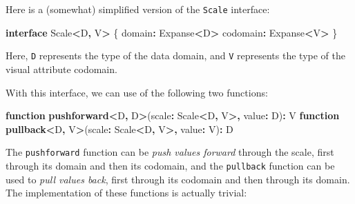\documentclass[
]{book}
\newenvironment{Shaded}{\begin{snugshade}}{\end{snugshade}}
\newcommand{\FunctionTok}[1]{\textcolor[rgb]{0.13,0.29,0.53}{\textbf{#1}}}
\newcommand{\KeywordTok}[1]{\textcolor[rgb]{0.13,0.29,0.53}{\textbf{#1}}}
\newcommand{\NormalTok}[1]{#1}
\newcommand{\OperatorTok}[1]{\textcolor[rgb]{0.81,0.36,0.00}{\textbf{#1}}}
\theoremstyle{definition}
\theoremstyle{definition}
\theoremstyle{definition}
\theoremstyle{definition}
\theoremstyle{remark}
\begin{document}
Here is a (somewhat) simplified version of the \texttt{Scale} interface:

\begin{Shaded}
\begin{Highlighting}[]
\KeywordTok{interface}\NormalTok{ Scale}\OperatorTok{\textless{}}\NormalTok{D}\OperatorTok{,}\NormalTok{ V}\OperatorTok{\textgreater{}}\NormalTok{ \{}
\NormalTok{  domain}\OperatorTok{:}\NormalTok{ Expanse}\OperatorTok{\textless{}}\NormalTok{D}\OperatorTok{\textgreater{}}
\NormalTok{  codomain}\OperatorTok{:}\NormalTok{ Expanse}\OperatorTok{\textless{}}\NormalTok{V}\OperatorTok{\textgreater{}}
\NormalTok{\}}
\end{Highlighting}
\end{Shaded}

Here, \texttt{D} represents the type of the data domain, and \texttt{V} represents the type of the visual attribute codomain.

With this interface, we can use of the following two functions:

\begin{Shaded}
\begin{Highlighting}[]
\KeywordTok{function} \FunctionTok{pushforward}\OperatorTok{\textless{}}\NormalTok{D}\OperatorTok{,}\NormalTok{ D}\OperatorTok{\textgreater{}}\NormalTok{(scale}\OperatorTok{:}\NormalTok{ Scale}\OperatorTok{\textless{}}\NormalTok{D}\OperatorTok{,}\NormalTok{ V}\OperatorTok{\textgreater{},}\NormalTok{ value}\OperatorTok{:}\NormalTok{ D)}\OperatorTok{:}\NormalTok{ V}
\KeywordTok{function} \FunctionTok{pullback}\OperatorTok{\textless{}}\NormalTok{D}\OperatorTok{,}\NormalTok{ V}\OperatorTok{\textgreater{}}\NormalTok{(scale}\OperatorTok{:}\NormalTok{ Scale}\OperatorTok{\textless{}}\NormalTok{D}\OperatorTok{,}\NormalTok{ V}\OperatorTok{\textgreater{},}\NormalTok{ value}\OperatorTok{:}\NormalTok{ V)}\OperatorTok{:}\NormalTok{ D}
\end{Highlighting}
\end{Shaded}

The \texttt{pushforward} function can be \emph{push values forward} through the scale, first through its domain and then its codomain, and the \texttt{pullback} function can be used to \emph{pull values back}, first through its codomain and then through its domain. The implementation of these functions is actually trivial:
\end{document}
